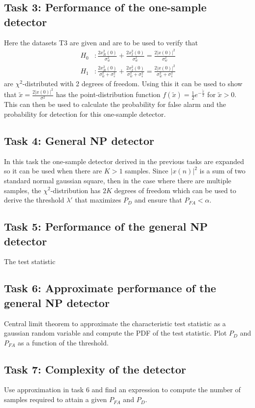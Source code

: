 \subsection{Task 3: Performance of the one-sample detector}
Here the datasets T3 are given and are to be used to verify that
\begin{align}
	H_0 &: \frac{2x_R^2(0)}{\sigma_w^2}+\frac{2x_I^2(0)}{\sigma_w^2}=\frac{2|x(0)|^2}{\sigma_w^2}\label{eq:chi_sq_h0}\\
	H_1 &: \frac{2x_R^2(0)}{\sigma_w^2+\sigma_s^2}+\frac{2x_I^2(0)}{\sigma_w^2+\sigma_s^2}=\frac{2|x(0)|^2}{\sigma_w^2+\sigma_s^2}\label{eq:chi_sq_h1}
\end{align}
are $\chi^2$-distributed with 2 degrees of freedom. Using this it can be used to show that $\widetilde{x} = \frac{2|x(0)|^2}{\sigma^2}$ has the point-distribution function $f(\widetilde{x}) = \frac{1}{2}e^{-\frac{\widetilde{x}}{2}}$ for $\widetilde{x}>0$. This can then be used to calculate the probability for false alarm and the probability for detection for this one-sample detector.

\subsection{Task 4: General NP detector}
In this task the one-sample detector derived in the previous tasks are expanded so it can be used when there are $K>1$ samples. Since $|x(n)|^2$ is a sum of two standard normal gaussian square, then in the case where there are multiple samples, the $\chi^2$-distribution has $2K$ degrees of freedom which can be used to derive the threshold $\lambda'$ that maximizes $P_D$ and ensure that $P_{FA}<\alpha$.

\subsection{Task 5: Performance of the general NP detector}
The test statistic 

\subsection{Task 6: Approximate performance of the general NP detector}
Central limit theorem to approximate the characteristic test statistic as a gaussian random variable and compute the PDF of the test statistic. Plot $P_D$ and $P_{FA}$ as a function of the threshold.

\subsection{Task 7: Complexity of the detector}
Use approximation in task 6 and find an expression to compute the number of samples required to attain a given $P_{FA}$ and $P_D$.

